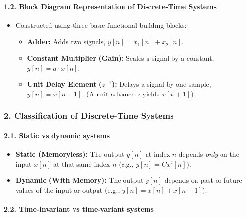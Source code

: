 \paragraph{1.2. Block Diagram Representation of Discrete-Time
Systems}\label{block-diagram-representation-of-discrete-time-systems}

\begin{itemize}
\tightlist
\item
  Constructed using three basic functional building blocks:

  \begin{itemize}
  \tightlist
  \item
    \textbf{Adder:} Adds two signals, \(y[n] = x_1[n] + x_2[n]\).
  \item
    \textbf{Constant Multiplier (Gain):} Scales a signal by a constant,
    \(y[n] = a \cdot x[n]\).
  \item
    \textbf{Unit Delay Element (\(z^{-1}\)):} Delays a signal by one
    sample, \(y[n] = x[n-1]\). (A unit advance \(z\) yields \(x[n+1]\)).
  \end{itemize}
\end{itemize}

\subsubsection{2. Classification of Discrete-Time
Systems}\label{classification-of-discrete-time-systems}

\paragraph{2.1. Static vs dynamic
systems}\label{static-vs-dynamic-systems}

\begin{itemize}
\tightlist
\item
  \textbf{Static (Memoryless):} The output \(y[n]\) at index \(n\)
  depends \emph{only} on the input \(x[n]\) at that same index \(n\)
  (e.g., \(y[n] = C x^2[n]\)).
\item
  \textbf{Dynamic (With Memory):} The output \(y[n]\) depends on past or
  future values of the input or output (e.g., \(y[n] = x[n] + x[n-1]\)).
\end{itemize}

\paragraph{2.2. Time-invariant vs time-variant
systems}\label{time-invariant-vs-time-variant-systems}


